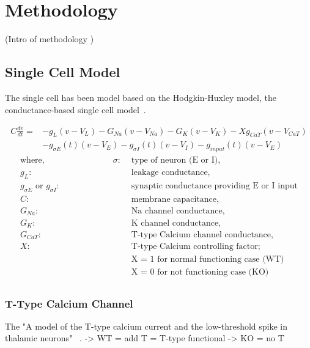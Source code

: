 \chapter{Methodology}

(Intro of methodology )


\section{Single Cell Model}

The single cell has been model based on the Hodgkin-Huxley model, the conductance-based single cell model~\cite{hodgkin1952quantitative}.

\begin{align*}
C\frac{dv}{dt} = &-g_L(v - V_L) - G_{Na}(v - V_{Na}) - G_K(v - V_K) - Xg_{CaT}(v - V_{CaT}) \\
&- g_{\sigma E}(t)(v - V_E) - g_{\sigma I}(t)(v - V_I) - g_{input}(t)(v - V_E)
\end{align*}
\begin{align*}
	\text{where,} \hspace{8em} \sigma :& \text{ type of neuron (E or I),}  \\
	g_L :& \text{ leakage conductance,} \\
	g_{\sigma E} \text{ or } g_{\sigma I} :& \text{ synaptic conductance providing E or I input} \\
	C :& \text{ membrane capacitance,}\\
	G_{Na} :& \text{ Na channel conductance,}\\
	G_{K} :& \text{ K channel conductance,}\\
	G_{CaT} :& \text{ T-type Calcium channel conductance,}\\
	X :& \text{ T-type Calcium controlling factor;}\\
	   &  \text{ X = 1 for normal functioning case (WT) }\\
	   &  \text{ X = 0 for not functioning case (KO) }\\
\end{align*}

\subsection{T-Type Calcium Channel}
The  "A model of the T-type calcium current and the low-threshold spike in thalamic neurons" ~\cite{wang1991model}.
-> WT =  add T = T-type functional 
-> KO = no T 

